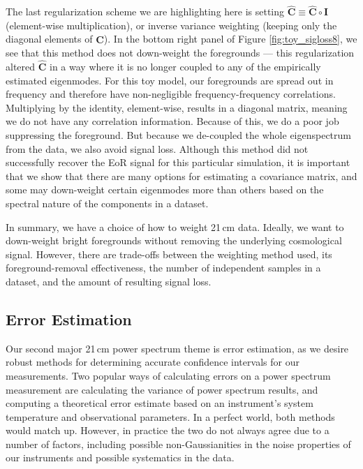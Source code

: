 \documentclass[preprint2,numberedappendix,tighten]{aastex6}  %
\begin{document}
The last regularization scheme we are highlighting here is setting $\widehat{\textbf{C}} \equiv \widehat{\textbf{C}} \circ \textbf{I}$ (element-wise multiplication), or inverse variance weighting (keeping only the diagonal elements of $\widehat{\textbf{C}}$). In the bottom right 
panel of Figure \ref{fig:toy_sigloss8}, we see that this method does not down-weight the foregrounds --- this regularization altered $\widehat{\textbf{C}}$ in a way where it is no longer coupled to any of the empirically estimated eigenmodes. For this toy model, 
our foregrounds are spread out in frequency and therefore have non-negligible frequency-frequency correlations. Multiplying by 
the identity, element-wise, results in a diagonal matrix, meaning we do not have any correlation information. Because of this, we do a poor job 
suppressing the foreground. But because we de-coupled the whole eigenspectrum from the data, we also avoid signal loss. Although this method did not successfully recover the EoR signal for this particular simulation, it is important that we show that there 
are many options for estimating a covariance matrix, and some may down-weight certain eigenmodes more than others based on the spectral nature 
of the components in a dataset. 

In summary, we have a choice of how to weight 21\,cm data. Ideally, we want to down-weight bright foregrounds without 
removing the underlying cosmological signal. However, there are trade-offs between the weighting method 
used, its foreground-removal effectiveness, the number of independent samples in a dataset, and the amount of resulting signal loss. 

\color{black}


\subsection{Error Estimation}
\label{sec:ErrorOverview}

Our second major 21\,cm power spectrum theme is error estimation, as we desire robust methods for determining accurate 
confidence intervals for our measurements. Two popular ways of calculating errors on a power spectrum 
measurement are calculating the variance of power spectrum results, and computing a theoretical error estimate based on an instrument's 
system temperature and observational parameters. In a perfect world, both methods would match up. However, in practice the 
two do not always agree due to a number of factors, including possible non-Gaussianities in the noise properties of our instruments and possible systematics in the data.
\end{document}

